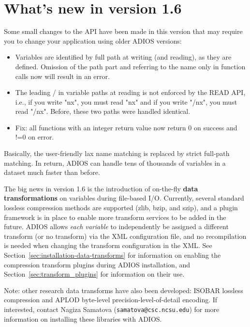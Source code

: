 %
%
\section {What's new in version 1.6}
Some small changes to the API have been made in this version that may require you to change your application using older ADIOS versions:
\begin{itemize}
\item Variables are identified by full path at writing (and reading), as they are defined. Omission of the path part and referring to the name only in function calls now will result in an error.
\item The leading / in variable paths at reading is not enforced by the READ API, i.e., if you write "nx", you must read "nx" and if you write "/nx", you must read "/nx". Before, these two paths were handled identical.
\item Fix: all functions with an integer return value now return 0 on success and !=0 on error.
\end{itemize}

Basically, the user-friendly lax name matching is replaced by strict full-path matching. In return, ADIOS can handle tens of thousands of variables in a dataset much faster than before.

\vspace{10pt}

\noindent The big news in version 1.6 is the introduction
of on-the-fly {\bf data transformations} on variables during file-based I/O.
Currently, several standard lossless compression methods are supported (zlib, bzip, and szip),
and a plugin framework is in place to enable more transform services to be added in the future.
ADIOS allows \emph{each variable} to independently be assigned a different transform
(or no transform) via the XML configuration file, and no recompilation is needed
when changing the transform configuration in the XML. See
Section~\ref{sec:installation-data-transforms} for information on enabling the compression
transform plugins during ADIOS installation, and Section~\ref{sec:transform_plugins}
for information on their use.

Note: other research data transforms have also been developed: ISOBAR lossless compression and
APLOD byte-level precision-level-of-detail encoding. If interested, contact
Nagiza Samatova (\verb+samatova@csc.ncsu.edu+) for more information
on installing these libraries with ADIOS.

\vspace{10pt}

